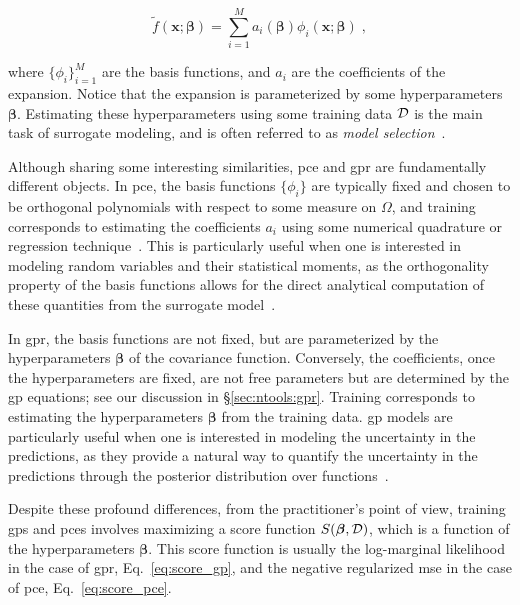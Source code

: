 \begin{equation}
    \tilde{f}(\mathbf{x}; \boldsymbol{\beta}) = \sum_{i=1}^{M} a_i(\boldsymbol{\beta}) \phi_i(\mathbf{x}; \boldsymbol{\beta}) \;,
    \label{eq:sota_2:lincomb}
\end{equation}

where $\{\phi_i\}_{i=1}^{M}$ are the basis functions, and $a_i$ are the coefficients of the expansion. Notice that the expansion is parameterized by some hyperparameters $\boldsymbol{\beta}$. Estimating these hyperparameters using some training data $\mathcal{D}$ is the main task of surrogate modeling, and is often referred to as \textit{model selection}~\cite{uq_theory}.

\smallskip
Although sharing some interesting similarities, \gls{pce} and \gls{gpr} are fundamentally different objects. In \gls{pce}, the basis functions $\{\phi_i\}$ are typically fixed and chosen to be orthogonal polynomials with respect to some measure on $\Omega$, and training corresponds to estimating the coefficients $a_i$ using some numerical quadrature or regression technique~\cite{Sudret2008}. This is particularly useful when one is interested in modeling random variables and their statistical moments, as the orthogonality property of the basis functions allows for the direct analytical computation of these quantities from the surrogate model~\cite{Sudret2008, Xiu2002}. 

\smallskip
In \gls{gpr}, the basis functions are not fixed, but are parameterized by the hyperparameters $\boldsymbol{\beta}$ of the covariance function. Conversely, the coefficients, once the hyperparameters are fixed, are not free parameters but are determined by the \gls{gp} equations; see our discussion in \S\ref{sec:ntools:gpr}. Training corresponds to estimating the hyperparameters $\boldsymbol{\beta}$ from the training data. \gls{gp} models are particularly useful when one is interested in modeling the uncertainty in the predictions, as they provide a natural way to quantify the uncertainty in the predictions through the posterior distribution over functions~\cite{uq_theory}.

\smallskip
Despite these profound differences, from the practitioner's point of view, training \glspl{gp} and \glspl{pce} involves maximizing a score function $S(\boldsymbol{\beta}, \mathcal{D})$, which is a function of the hyperparameters $\boldsymbol{\beta}$. This score function is usually the log-marginal likelihood in the case of \gls{gpr}, Eq.~\eqref{eq:score_gp}, and the negative regularized \gls{mse} in the case of \gls{pce}, Eq.~\eqref{eq:score_pce}.

